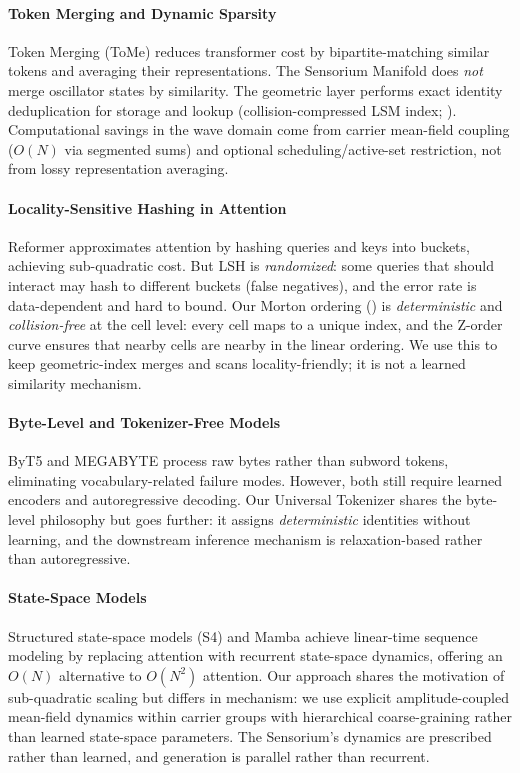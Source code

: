\documentclass[11pt,a4paper]{article}
\begin{document}
\paragraph{Token Merging and Dynamic Sparsity}
Token Merging (ToMe) \citep{bolya2023token, bolya2023token_diffusion} reduces transformer cost by bipartite-matching similar tokens and averaging their representations. The Sensorium Manifold does \emph{not} merge oscillator states by similarity. The geometric layer performs exact identity deduplication for storage and lookup (collision-compressed LSM index; ). Computational savings in the wave domain come from carrier mean-field coupling ($O(N)$ via segmented sums) and optional scheduling/active-set restriction, not from lossy representation averaging.

\paragraph{Locality-Sensitive Hashing in Attention}
Reformer \citep{kitaev2020reformer} approximates attention by hashing queries and keys into buckets, achieving sub-quadratic cost. But LSH is \emph{randomized}: some queries that should interact may hash to different buckets (false negatives), and the error rate is data-dependent and hard to bound. Our Morton ordering () is \emph{deterministic} and \emph{collision-free} at the cell level: every cell maps to a unique index, and the Z-order curve ensures that nearby cells are nearby in the linear ordering. We use this to keep geometric-index merges and scans locality-friendly; it is not a learned similarity mechanism.

\paragraph{Byte-Level and Tokenizer-Free Models}
ByT5 \citep{xue2022byt5} and MEGABYTE \citep{yu2024megabyte} process raw bytes rather than subword tokens, eliminating vocabulary-related failure modes. However, both still require learned encoders and autoregressive decoding. Our Universal Tokenizer shares the byte-level philosophy but goes further: it assigns \emph{deterministic} identities without learning, and the downstream inference mechanism is relaxation-based rather than autoregressive.

\paragraph{State-Space Models}
Structured state-space models (S4) \citep{gu2022efficiently} and Mamba \citep{gu2024mamba} achieve linear-time sequence modeling by replacing attention with recurrent state-space dynamics, offering an $O(N)$ alternative to $O(N^2)$ attention. Our approach shares the motivation of sub-quadratic scaling but differs in mechanism: we use explicit amplitude-coupled mean-field dynamics within carrier groups with hierarchical coarse-graining rather than learned state-space parameters. The Sensorium's dynamics are prescribed rather than learned, and generation is parallel rather than recurrent.
\end{document}

